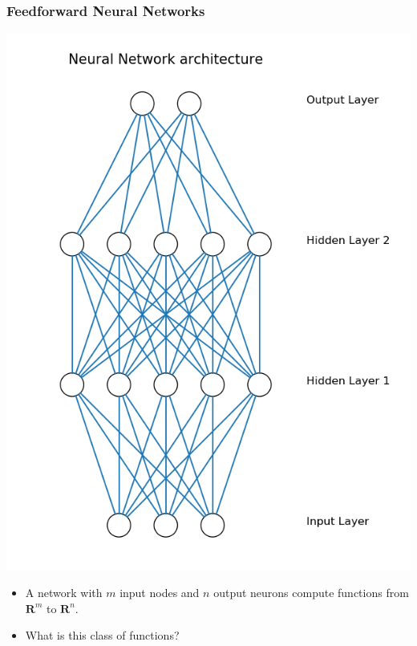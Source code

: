 \documentclass[11pt]{beamer}
\newcommand{\R}{\ensuremath{\mathbf{R}}}
\begin{document}
\begin{frame}[t]
\frametitle{Feedforward Neural Networks}
\vspace{-1cm}
\begin{center}
\begin{turn}{-90}
\includegraphics[scale=0.28]{feedforward.png}
\end{turn}
\end{center}
{\small
\begin{itemize}
    \item A network with $m$ input nodes and $n$ output
        neurons compute functions from $\R^m$ to $\R^n$.
    \item What is this class of functions?
\end{itemize}
}
\end{frame}
\end{document}
